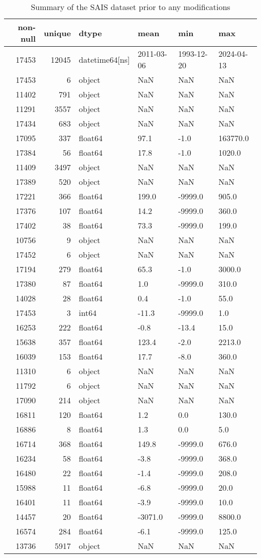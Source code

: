 \begin{table}[H]
\caption{Summary of the SAIS dataset prior to any modifications}
\label{tbl:sais_summary_initial}
\begin{tabular}{rrllll}
\toprule
non-null & unique & dtype & mean & min & max \\
\midrule
17453 & 12045 & datetime64[ns] & 2011-03-06 & 1993-12-20 & 2024-04-13 \\
17453 & 6 & object & NaN & NaN & NaN \\
11402 & 791 & object & NaN & NaN & NaN \\
11291 & 3557 & object & NaN & NaN & NaN \\
17434 & 683 & object & NaN & NaN & NaN \\
17095 & 337 & float64 & 97.1 & -1.0 & 163770.0 \\
17384 & 56 & float64 & 17.8 & -1.0 & 1020.0 \\
11409 & 3497 & object & NaN & NaN & NaN \\
17389 & 520 & object & NaN & NaN & NaN \\
17221 & 366 & float64 & 199.0 & -9999.0 & 905.0 \\
17376 & 107 & float64 & 14.2 & -9999.0 & 360.0 \\
17402 & 38 & float64 & 73.3 & -9999.0 & 199.0 \\
10756 & 9 & object & NaN & NaN & NaN \\
17452 & 6 & object & NaN & NaN & NaN \\
17194 & 279 & float64 & 65.3 & -1.0 & 3000.0 \\
17380 & 87 & float64 & 1.0 & -9999.0 & 310.0 \\
14028 & 28 & float64 & 0.4 & -1.0 & 55.0 \\
17453 & 3 & int64 & -11.3 & -9999.0 & 1.0 \\
16253 & 222 & float64 & -0.8 & -13.4 & 15.0 \\
15638 & 357 & float64 & 123.4 & -2.0 & 2213.0 \\
16039 & 153 & float64 & 17.7 & -8.0 & 360.0 \\
11310 & 6 & object & NaN & NaN & NaN \\
11792 & 6 & object & NaN & NaN & NaN \\
17090 & 214 & object & NaN & NaN & NaN \\
16811 & 120 & float64 & 1.2 & 0.0 & 130.0 \\
16886 & 8 & float64 & 1.3 & 0.0 & 5.0 \\
16714 & 368 & float64 & 149.8 & -9999.0 & 676.0 \\
16234 & 58 & float64 & -3.8 & -9999.0 & 368.0 \\
16480 & 22 & float64 & -1.4 & -9999.0 & 208.0 \\
15988 & 11 & float64 & -6.8 & -9999.0 & 20.0 \\
16401 & 11 & float64 & -3.9 & -9999.0 & 10.0 \\
14457 & 20 & float64 & -3071.0 & -9999.0 & 8800.0 \\
16574 & 284 & float64 & -6.1 & -9999.0 & 125.0 \\
13736 & 5917 & object & NaN & NaN & NaN \\
\bottomrule
\end{tabular}
\end{table}

